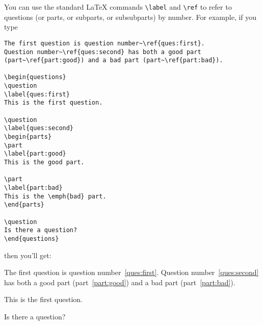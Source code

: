 \documentclass[12pt]{exam}
\begin{document}
You can use the standard \LaTeX{} commands \verb"\label" and
\verb"\ref" to refer to questions (or parts, or subparts, or
subsubparts) by number.  For example, if you type
\begin{verbatim}
The first question is question number~\ref{ques:first}.
Question number~\ref{ques:second} has both a good part
(part~\ref{part:good}) and a bad part (part~\ref{part:bad}).

\begin{questions}
\question
\label{ques:first}
This is the first question.

\question
\label{ques:second}
\begin{parts}
\part
\label{part:good}
This is the good part.

\part
\label{part:bad}
This is the \emph{bad} part.
\end{parts}

\question
Is there a question?
\end{questions}
\end{verbatim}
then you'll get:

\medskip

The first question is question number~\ref{ques:first}.
Question number~\ref{ques:second} has both a good part
(part~\ref{part:good}) and a bad part (part~\ref{part:bad}).

\begin{questions}
\question
\label{ques:first}
This is the first question.

\question
\label{ques:second}

\question
Is there a question?
\end{questions}
\end{document}
